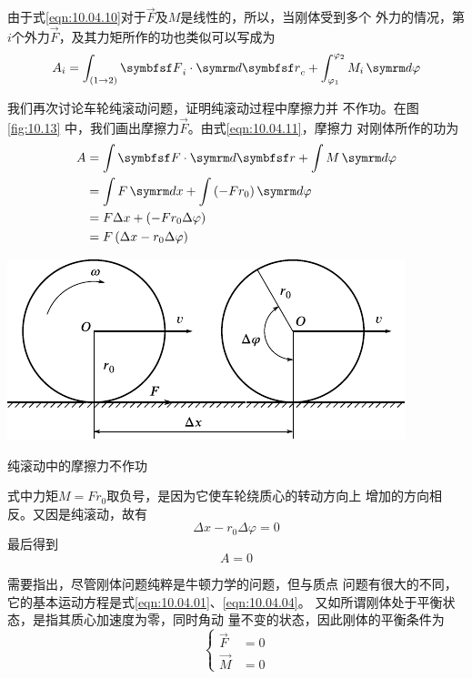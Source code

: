 由于式\eqref{eqn:10.04.10}对于$\vec{F}$及$ M $是线性的，所以，当刚体受到多个
外力的情况，第$ i $个外力$\vec{F}$，及其力矩所作的功也类似可以写成为\vspace{-1.56em}
\begin{equation}\label{eqn:10.04.11}
    A _ i = \int _ { ( 1 \to 2 ) } \vec{F} _ i \cdot  \dif \vec{r} _ { c } + \int _ {\varphi_{ 1 }} ^ {\varphi_{ 2 }}  M _ i \dif \varphi
\end{equation}

我们再次讨论车轮纯滚动问题，证明纯滚动过程中摩擦力并
不作功。在图\ref{fig:10.13} 中，我们画出摩擦力$\vec{F}$。由式\eqref{eqn:10.04.11}，摩擦力
对刚体所作的功为
\begin{equation*}
    \begin{split}
        A &= \int \vec{ F } \cdot  \dif \vec{r} + \int M  \dif \varphi \\
      &= \int F  \dif x + \int \left( - F r _ { 0 } \right)  \dif \varphi \\
      &= F \Delta x + \left( - F r _ { 0 } \Delta \varphi \right) \\%
      &= F \left( \Delta x - r _ { 0 } \Delta \varphi \right)
    \end{split}
\end{equation*}

\begin{figurex}
    \centering
    \includegraphics{figure/fig10.13}
    \caption{纯滚动中的摩擦力不作功}
    \label{fig:10.13}
\end{figurex}
\noindent
式中力矩$  M = F r _ { 0 }   $取负号，是因为它使车轮绕质心的转动方向上
增加的方向相反。又因是纯滚动，故有
\begin{equation*}
    \Delta x - r _ { 0 } \Delta \varphi = 0
\end{equation*}
最后得到
\begin{equation*}
    A = 0
\end{equation*}

需要指出，尽管刚体问题纯粹是牛顿力学的问题，但与质点
问题有很大的不同，它的基本运动方程是式\eqref{eqn:10.04.01}、\eqref{eqn:10.04.04}。
又如所谓刚体处于平衡状态，是指其质心加速度为零，同时角动
量不变的状态，因此刚体的平衡条件为
\begin{equation}\label{eqn:10.04.12}
    \begin{cases}
        \vec{ F } &= 0 \\
        \vec{ M } &= 0
    \end{cases}
\end{equation}

